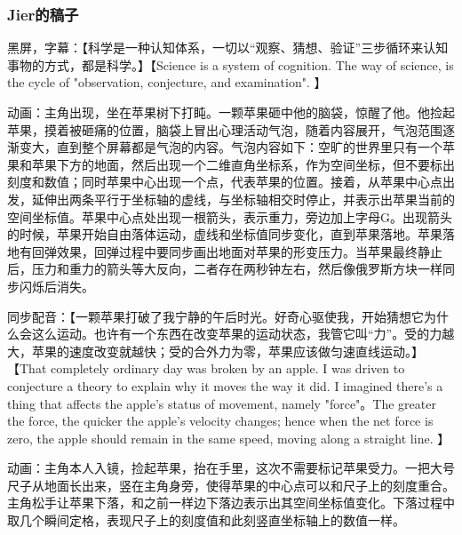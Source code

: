
\begin{issues}
\issueDraft
\end{issues}


\subsubsection{Jier的稿子}



黑屏，字幕：【科学是一种认知体系，一切以“观察、猜想、验证”三步循环来认知事物的方式，都是科学。】【Science is a system of cognition. The way of science, is the cycle of "observation, conjecture, and examination". 】

动画：主角出现，坐在苹果树下打盹。一颗苹果砸中他的脑袋，惊醒了他。他捡起苹果，摸着被砸痛的位置，脑袋上冒出心理活动气泡，随着内容展开，气泡范围逐渐变大，直到整个屏幕都是气泡的内容。气泡内容如下：空旷的世界里只有一个苹果和苹果下方的地面，然后出现一个二维直角坐标系，作为空间坐标，但不要标出刻度和数值；同时苹果中心出现一个点，代表苹果的位置。接着，从苹果中心点出发，延伸出两条平行于坐标轴的虚线，与坐标轴相交时停止，并表示出苹果当前的空间坐标值。苹果中心点处出现一根箭头，表示重力，旁边加上字母G。出现箭头的时候，苹果开始自由落体运动，虚线和坐标值同步变化，直到苹果落地。苹果落地有回弹效果，回弹过程中要同步画出地面对苹果的形变压力。当苹果最终静止后，压力和重力的箭头等大反向，二者存在两秒钟左右，然后像俄罗斯方块一样同步闪烁后消失。

同步配音：【一颗苹果打破了我宁静的午后时光。好奇心驱使我，开始猜想它为什么会这么运动。也许有一个东西在改变苹果的运动状态，我管它叫“力”。受的力越大，苹果的速度改变就越快；受的合外力为零，苹果应该做匀速直线运动。】【That completely ordinary day was broken by an apple. I was driven to conjecture a theory to explain why it moves the way it did. I imagined there's a thing that affects the apple's status of movement, namely "force"。The greater the force, the quicker the apple's velocity changes; hence when the net force is zero, the apple should remain in the same speed, moving along a straight line. 】






动画：主角本人入镜，捡起苹果，抬在手里，这次不需要标记苹果受力。一把大号尺子从地面长出来，竖在主角身旁，使得苹果的中心点可以和尺子上的刻度重合。主角松手让苹果下落，和之前一样边下落边表示出其空间坐标值变化。下落过程中取几个瞬间定格，表现尺子上的刻度值和此刻竖直坐标轴上的数值一样。


